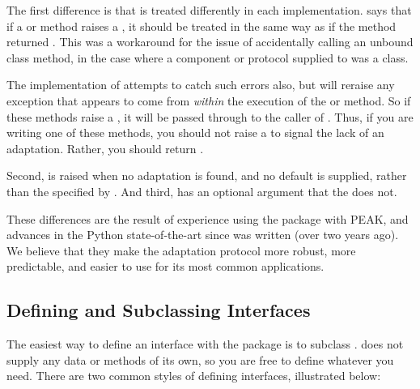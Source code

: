 The first difference is that  is treated differently in
each implementation.   says that if a  or
 method raises a , it should be
treated in the same way as if the method returned .  This was
a workaround for the issue of accidentally calling an unbound class
method, in the case where a component or protocol supplied to
 was a class.

The  implementation of  attempts to catch
such errors also, but will reraise any exception that appears to come from
\emph{within} the execution of the  or
 method.  So if these methods raise a ,
it will be passed through to the caller of .  Thus, if you
are writing one of these methods, you should not raise a 
to signal the lack of an adaptation.  Rather, you should return .

Second,  is raised when no adaptation is
found, and no default is supplied, rather than the 
specified by .  And third,  has an optional
 argument that the   does not.

These differences are the result of experience using the 
package with PEAK, and advances in the Python state-of-the-art since
 was written (over two years ago).  We believe that they make the
adaptation protocol more robust, more predictable, and easier to use for
its most common applications.






\subsection{Defining and Subclassing Interfaces \label{protocols-defining}}

The easiest way to define an interface with the  package is
to subclass .   does not supply any
data or methods of its own, so you are free to define whatever you need. There
are two common styles of defining interfaces, illustrated below:

